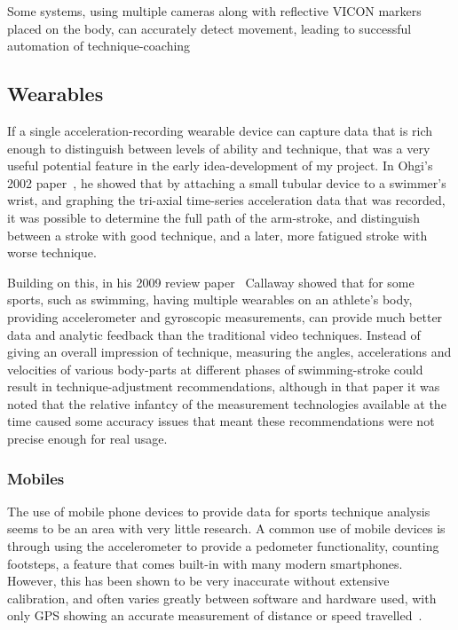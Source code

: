 Some systems, using multiple cameras along with reflective VICON markers placed on the body, can accurately detect movement, leading to successful automation of technique-coaching~\cite{automaticrowingcoach}


\subsection{Wearables}
If a single acceleration-recording wearable device can capture data that is rich enough to distinguish between levels of ability and technique, that was a very useful potential feature in the early idea-development of my project.
In Ohgi's 2002 paper~\cite{oghiswim}, he showed that by attaching a small tubular device to a swimmer's wrist, and graphing the tri-axial time-series acceleration data that was recorded, it was possible to determine the full path of the arm-stroke, and distinguish between a stroke with good technique, and a later, more fatigued stroke with worse technique.

Building on this, in his 2009 review paper~\cite{callawayvideoacccomp} Callaway showed that for some sports, such as swimming, having multiple wearables on an athlete's body, providing accelerometer and gyroscopic measurements, can provide much better data and analytic feedback than the traditional video techniques.
Instead of giving an overall impression of technique, measuring the angles, accelerations and velocities of various body-parts at different phases of swimming-stroke could result in technique-adjustment recommendations, although in that paper it was noted that the relative infantcy of the measurement technologies available at the time caused some accuracy issues that meant these recommendations were not precise enough for real usage.

\subsubsection{Mobiles}
The use of mobile phone devices to provide data for sports technique analysis seems to be an area with very little research.
A common use of mobile devices is through using the accelerometer to provide a pedometer functionality, counting footsteps, a feature that comes built-in with many modern smartphones.
However, this has been shown to be very inaccurate without extensive calibration, and often varies greatly between software and hardware used, with only GPS showing an accurate measurement of distance or speed travelled~\cite{pedometer}.

